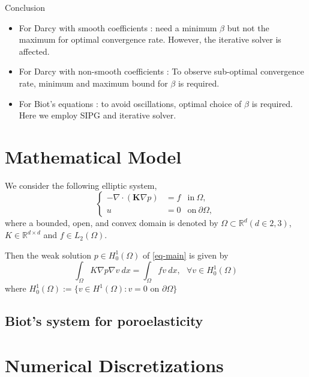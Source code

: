 \documentclass{article}
\begin{document}
Conclusion
\begin{itemize}
\item For Darcy with smooth coefficients : need a minimum $\beta$ but not the maximum for optimal convergence rate. However, the iterative solver is affected.
\item For Darcy with non-smooth coefficients : To observe sub-optimal convergence rate, minimum and maximum bound for $\beta$ is required. 
\item For Biot's equations : to avoid oscillations, optimal choice of $\beta$ is required. Here we employ SIPG and iterative solver. 
\end{itemize}

\section{Mathematical Model}
We consider the following elliptic system,  
\begin{equation}\label{eq-main}
\left\{ 
\begin{array}{rll} 
-\nabla \cdot \left( \bm{K} \nabla p \right)
&=  f
& \textrm{in}~\Omega, \\
u&=0& \textrm{on}~\partial \Omega,
\end{array}
\right.
\end{equation}
where a bounded, open, and convex domain is denoted by 
$\Omega \subset \mathbb{R}^d (d \in {2,3})$, $K\in \mathbb{R}^{d\times d}$ and $f \in L_2(\Omega)$.

Then the weak solution $p \in H_0^{1}(\Omega)$ 
of \eqref{eq-main} is given by 
\begin{equation}
\int_\Omega K \nabla p \nabla v \ dx = 
\int_\Omega f  v \ dx, \ \ \ \forall v \in H_0^1(\Omega)
\label{eq-weak}
\end{equation}
where $H_0^1(\Omega):= \{  v \in H^1(\Omega): v = 0 \text{ on } \partial \Omega \}$

\subsection{Biot's system for poroelasticity}

\section{Numerical Discretizations}
\end{document}
